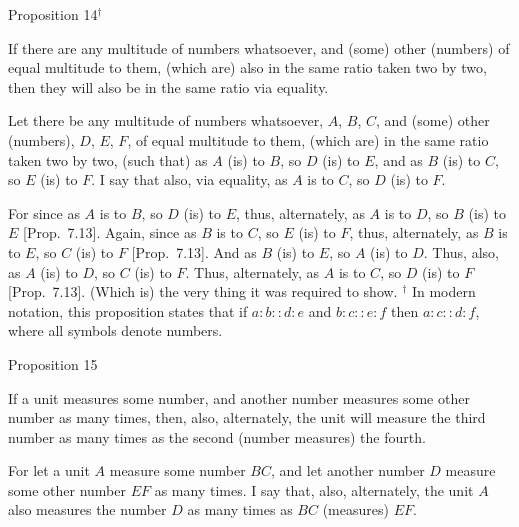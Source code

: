 
\begin{center}
{\large Proposition 14}$^\dag$
\end{center}

If there are any multitude of numbers whatsoever,
and (some) other (numbers) of  equal  multitude to them, (which are)
also in the same ratio taken two by two, then they will also
be in the same ratio via equality.

\epsfysize=0.65in
\centerline{}

Let there be any multitude of numbers whatsoever, $A$, $B$,  $C$, and 
(some) other (numbers), $D$, $E$, $F$, of equal multitude to them, (which are)
in the same ratio taken two by two, (such that) as $A$ (is) to $B$, so $D$ (is) to $E$,
and as $B$ (is) to $C$, so $E$ (is) to $F$. I say that also, via equality, 
as $A$ is to $C$, so $D$ (is) to $F$.

For since as $A$ is to $B$, so $D$ (is) to $E$, thus, alternately, as $A$ is to $D$, so
$B$ (is) to $E$  [Prop.~7.13]. Again, since
as $B$ is to $C$, so $E$ (is) to $F$, thus, alternately, as $B$ is to $E$, so $C$ (is) to $F$
[Prop.~7.13]. And as $B$ (is) to $E$, so
$A$ (is) to $D$. Thus, also, as $A$ (is) to $D$, so $C$ (is) to $F$. Thus,
alternately, as $A$ is to $C$, so $D$ (is) to $F$ [Prop.~7.13]. (Which is) the very thing it was required to show.
{\footnotesize\noindent$^\dag$ In modern notation, this
proposition states that if $a:b::d:e$ and $b:c::e:f$ then $a:c::d:f$, where
all symbols denote numbers.}


\begin{center}
{\large Proposition 15}
\end{center}

If a unit measures some number, and another number
measures some other number as many times, then, also, alternately, the unit will measure the
third number as many times as the second (number measures) the fourth.

\epsfysize=0.65in
\centerline{}

For let a unit $A$ measure some number $BC$, and let another number $D$ measure some
other number $EF$ as many times. I  say that, also, alternately,
the unit $A$ also measures the number $D$ as many times
as $BC$ (measures) $EF$.

